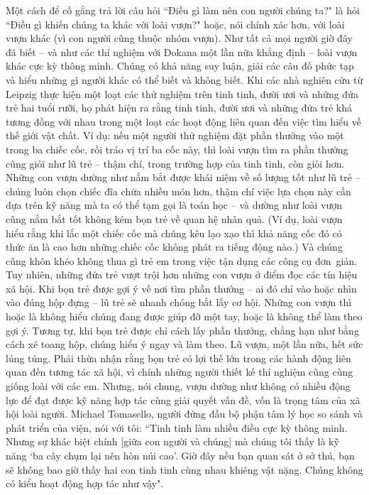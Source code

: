 \begin{multicols}{2}
	\vskip 0.1cm
	Một cách để cố gắng trả lời câu hỏi ``Điều gì làm nên con người chúng ta?" là hỏi ``Điều gì khiến chúng ta khác với loài vượn?" hoặc, nói chính xác hơn, với loài vượn khác (vì con người cũng thuộc nhóm vượn). Như tất cả mọi người giờ đây đã biết -- và như các thí nghiệm với Dokana một lần nữa khẳng định -- loài vượn khác cực kỳ thông minh. Chúng có khả năng suy luận, giải các câu đố phức tạp và hiểu những gì người khác có thể biết và không biết. Khi các nhà nghiên cứu từ Leipzig thực hiện một loạt các thử nghiệm trên tinh tinh, đười ươi và những đứa trẻ hai tuổi rưỡi, họ phát hiện ra rằng tinh tinh, đười ươi và những đứa trẻ khá tương đồng với nhau trong một loạt các hoạt động liên quan đến việc tìm hiểu về thế giới vật chất. Ví dụ: nếu một người thử nghiệm đặt phần thưởng vào một trong ba chiếc cốc, rồi tráo vị trí ba cốc này, thì loài vượn tìm ra phần thưởng cũng giỏi như lũ trẻ -- thậm chí, trong trường hợp của tinh tinh, còn giỏi hơn. Những con vượn dường như nắm bắt được khái niệm về số lượng tốt như lũ trẻ -- chúng luôn chọn chiếc đĩa chứa nhiều món hơn, thậm chí việc lựa chọn này cần dựa trên kỹ năng mà ta có thể tạm gọi là toán học -- và dường như loài vượn cũng nắm bắt tốt không kém bọn trẻ về quan hệ nhân quả. (Ví dụ, loài vượn hiểu rằng khi lắc một chiếc cốc mà chúng kêu lạo xạo thì khả năng cốc đó có thức ăn là cao hơn những chiếc cốc không phát ra tiếng động nào.) Và chúng cũng khôn khéo không thua gì trẻ em trong việc tận dụng các công cụ đơn~giản.
	\vskip 0.1cm
	Tuy nhiên, những đứa trẻ vượt trội hơn những con vượn ở điểm đọc các tín hiệu xã hội. Khi bọn trẻ được gợi ý về nơi tìm phần thưởng -- ai đó chỉ vào hoặc nhìn vào đúng hộp đựng -- lũ trẻ sẽ nhanh chóng bắt lấy cơ hội. Những con vượn thì hoặc là không hiểu chúng đang được giúp đỡ một tay, hoặc là không thể làm theo gợi ý. Tương tự, khi bọn trẻ được chỉ cách lấy phần thưởng, chẳng hạn như bằng cách xé toang hộp, chúng hiểu ý ngay và làm theo. Lũ vượn, một lần nữa, hết sức lúng túng. Phải thừa nhận rằng bọn trẻ có lợi thế lớn trong các hành động liên quan đến tương tác xã hội, vì chính những người thiết kế thí nghiệm cũng cùng giống loài với các em. Nhưng, nói chung, vượn dường như không có nhiều động lực để đạt được kỹ năng hợp tác cùng giải quyết vấn đề, vốn là trọng tâm của xã hội loài người.
	\vskip 0.1cm
	Michael Tomasello, người đứng đầu bộ phận tâm lý học so sánh và phát triển của viện, nói với tôi: ``Tinh tinh làm nhiều điều cực kỳ thông minh. Nhưng sự khác biệt chính [giữa con người và chúng] mà chúng tôi thấy là kỹ năng ‘ba cây chụm lại nên hòn núi cao’. Giờ đây nếu bạn quan sát ở sở thú, bạn sẽ không bao giờ thấy hai con tinh tinh cùng nhau khiêng vật nặng. Chúng không có kiểu hoạt động hợp tác như vậy".

\end{multicols}
